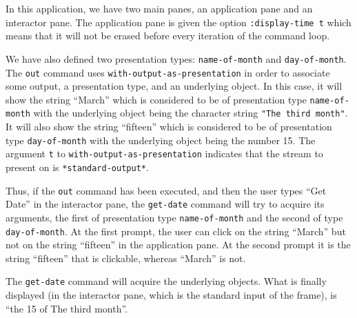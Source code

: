 In this application, we have two main panes, an application pane and an
interactor pane.  The application pane is given the option
\texttt{:display-time t} which means that it will not be erased before every
iteration of the command loop.

We have also defined two presentation types: \texttt{name-of-month} and
\texttt{day-of-month}.  The \texttt{out} command uses
\texttt{with-output-as-presentation} in order to associate some output, a
presentation type, and an underlying object.  In this case, it will show
the string ``March'' which is considered to be of presentation type
\texttt{name-of-month} with the underlying object being the character string
\texttt{"The third month"}.  It will also show the string ``fifteen'' which
is considered to be of presentation type \texttt{day-of-month} with the
underlying object being the number 15.  The argument \texttt{t} to
\texttt{with-output-as-presentation} indicates that the stream to present on
is \texttt{*standard-output*}.

Thus, if the \texttt{out} command has been executed, and then the user types
``Get Date'' in the interactor pane, the \texttt{get-date} command will try
to acquire its arguments, the first of presentation type
\texttt{name-of-month} and the second of type \texttt{day-of-month}.  At the first
prompt, the user can click on the string ``March'' but not on the string
``fifteen'' in the application pane.  At the second prompt it is the
string ``fifteen'' that is clickable, whereas ``March'' is not.

The \texttt{get-date} command will acquire the underlying objects.  What is
finally displayed (in the interactor pane, which is the standard input
of the frame), is ``the 15 of The third month''.
